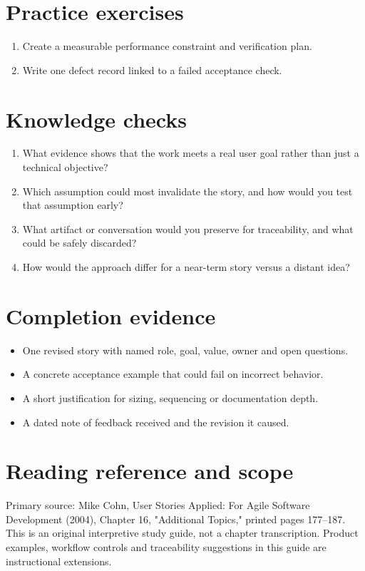 \documentclass[11pt,letterpaper]{article}
\begin{document}
\section{Practice exercises}
\begin{enumerate}[leftmargin=*,itemsep=3pt]
\item Create a measurable performance constraint and verification plan.
\item Write one defect record linked to a failed acceptance check.
\end{enumerate}
\section{Knowledge checks}
\begin{enumerate}[leftmargin=*,itemsep=3pt]
\item What evidence shows that the work meets a real user goal rather than just a technical objective?
\item Which assumption could most invalidate the story, and how would you test that assumption early?
\item What artifact or conversation would you preserve for traceability, and what could be safely discarded?
\item How would the approach differ for a near-term story versus a distant idea?
\end{enumerate}
\section{Completion evidence}
\begin{itemize}[leftmargin=*,itemsep=2pt]
\item One revised story with named role, goal, value, owner and open questions.
\item A concrete acceptance example that could fail on incorrect behavior.
\item A short justification for sizing, sequencing or documentation depth.
\item A dated note of feedback received and the revision it caused.
\end{itemize}
\section{Reading reference and scope}
Primary source: Mike Cohn, User Stories Applied: For Agile Software Development (2004), Chapter 16, "Additional Topics," printed pages 177–187. This is an original interpretive study guide, not a chapter transcription. Product examples, workflow controls and traceability suggestions in this guide are instructional extensions.
\end{document}
